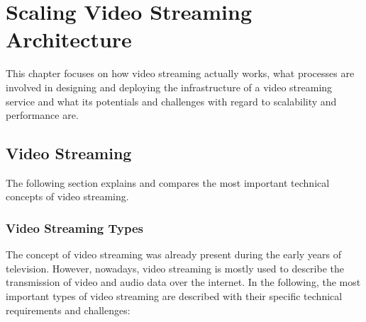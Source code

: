 \chapter{Scaling Video Streaming Architecture}\label{chapter:videostreaming}

This chapter focuses on how video streaming actually works, what processes are involved in designing and deploying the infrastructure of a video streaming service and what its potentials and challenges with regard to scalability and performance are.   

\section{Video Streaming}\label{section:video-streaming}

The following section explains and compares the most important technical concepts of video streaming.

\subsection{Video Streaming Types}\label{subsection:video-streaming-types}
The concept of video streaming was already present during the early years of television. However, nowadays, video streaming is mostly used to describe the transmission of video and audio data over the internet. In the following, the most important types of video streaming are described with their specific technical requirements and challenges:

